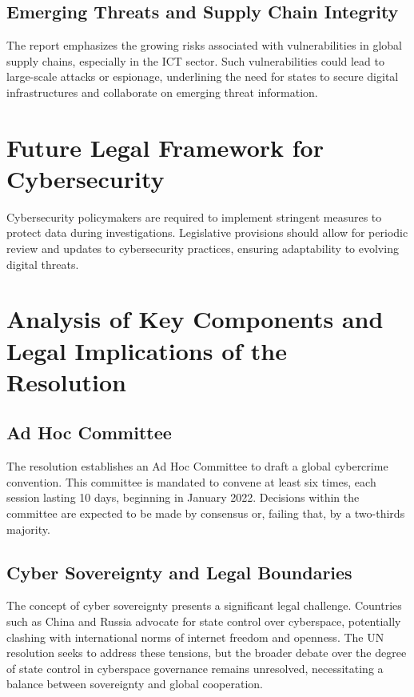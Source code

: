 \subsection{Emerging Threats and Supply Chain Integrity}
The report emphasizes the growing risks associated with vulnerabilities in global supply chains, especially in the ICT sector. Such vulnerabilities could lead to large-scale attacks or espionage, underlining the need for states to secure digital infrastructures and collaborate on emerging threat information.

\section{Future Legal Framework for Cybersecurity}
Cybersecurity policymakers are required to implement stringent measures to protect data during investigations. Legislative provisions should allow for periodic review and updates to cybersecurity practices, ensuring adaptability to evolving digital threats.

\section{Analysis of Key Components and Legal Implications of the
Resolution}

\subsection{Ad Hoc Committee}
The resolution establishes an Ad Hoc Committee to draft a global cybercrime convention. This committee is mandated to convene at least six times, each session lasting 10 days, beginning in January 2022. Decisions within the committee are expected to be made by consensus or, failing that, by a two-thirds majority.

\subsection{Cyber Sovereignty and Legal Boundaries}
The concept of cyber sovereignty presents a significant legal challenge. Countries such as China and Russia advocate for state control over cyberspace, potentially clashing with international norms of internet freedom and openness. The UN resolution seeks to address these tensions, but the broader debate over the degree of state control in cyberspace governance remains unresolved, necessitating a balance between sovereignty and global cooperation.

